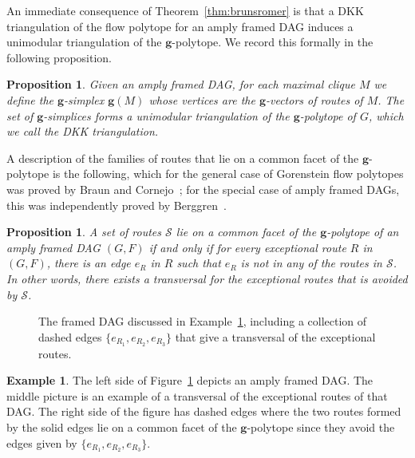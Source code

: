 \documentclass[12pt]{amsart}
\newtheorem{proposition}[theorem]{Proposition}
\theoremstyle{definition}
\newtheorem{example}[theorem]{Example}
\newcommand{\defn}[1]{\emph{\color{blue} #1}}
\newcommand\bg{\mathbf{g}}
\begin{document}
An immediate consequence of Theorem~\ref{thm:brunsromer} is that a DKK triangulation of the flow polytope for an amply framed DAG induces a unimodular triangulation of the $\bg$-polytope.
We record this formally in the following proposition.

\begin{proposition}\label{prop:dkkgpolytope}
    Given an amply framed DAG, for each maximal clique $M$ we define the \defn{$\bg$-simplex} $\bg(M)$ whose vertices are the $\bg$-vectors of routes of $M$. 
    The set of $\bg$-simplices forms a unimodular triangulation of the $\bg$-polytope of $G$, which we call the \defn{DKK triangulation}.
\end{proposition}

A description of the families of routes that lie on a common facet of the $\bg$-polytope is the following, which for the general case of Gorenstein flow polytopes was proved by Braun and Cornejo~\cite{BraunCornejo}; for the special case of amply framed DAGs, this was independently proved by Berggren~\cite{Berggren}.

\begin{proposition}\label{prop:dagfacesgpolytope}
A set of routes $\mathcal{S}$ lie on a common facet of the $\bg$-polytope of an amply framed DAG $(G,F)$ if and only if for every exceptional route $R$ in $(G,F)$, there is an edge $e_R$ in $R$ such that $e_R$ is not in any of the routes in $\mathcal{S}$.
In other words, there exists a transversal for the exceptional routes that is avoided by $\mathcal{S}$.
\end{proposition}

\begin{figure}
    \centering
    
    \caption{The framed DAG discussed in Example~\ref{ex:transversal}, including  a collection of dashed edges $\{e_{R_1},e_{R_2},e_{R_3}\}$ that give a transversal of the exceptional routes.}
    \label{fig:facettransversal}
\end{figure}

\begin{example}\label{ex:transversal}
The left side of Figure~\ref{fig:facettransversal} depicts an amply framed DAG.
The middle picture is an example of a transversal of the exceptional routes of that DAG. 
The right side of the figure has dashed edges where the two routes formed by the solid edges lie on a common facet of the $\bg$-polytope since they avoid the edges given by $\{e_{R_1},e_{R_2},e_{R_3}\}$.
\end{example}
\end{document}
